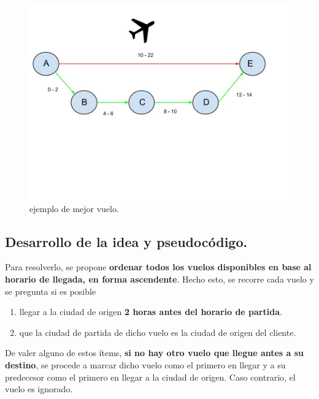 \begin{figure}[htb]
  \begin{center}
      \includegraphics[scale=0.25]{imagenes/plane.jpg}
  \end{center}
  \caption{ejemplo de mejor vuelo.}
\end{figure}



\newpage
\subsection{Desarrollo de la idea y pseudocódigo.}

\vspace*{0.3cm}

Para resolverlo, se propone \textbf{ordenar todos los vuelos disponibles
en base al horario de llegada, en forma ascendente}. Hecho esto, se recorre
cada vuelo y se pregunta si es posible

\begin{enumerate}
  \item llegar a la ciudad de origen \textbf{2 horas antes del horario de partida}.
  \item que la ciudad de partida de dicho vuelo es la ciudad de origen del cliente.
\end{enumerate}

De valer alguno de estos ítems, \textbf{si no hay otro vuelo que llegue antes
a su destino}, se procede a marcar dicho vuelo como el primero en llegar y a
su predecesor como el primero en llegar a la ciudad de origen. Caso contrario,
el vuelo es ignorado.

